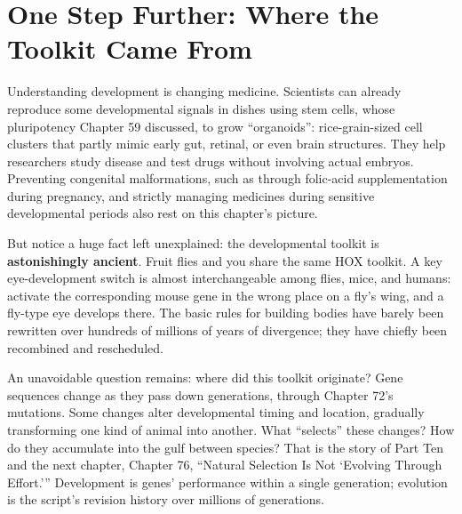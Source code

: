 \section{One Step Further: Where the Toolkit Came From}

Understanding development is changing medicine. Scientists can already reproduce some developmental signals in dishes using stem cells, whose pluripotency Chapter 59 discussed, to grow ``organoids'': rice-grain-sized cell clusters that partly mimic early gut, retinal, or even brain structures. They help researchers study disease and test drugs without involving actual embryos. Preventing congenital malformations, such as through folic-acid supplementation during pregnancy, and strictly managing medicines during sensitive developmental periods also rest on this chapter's picture.

But notice a huge fact left unexplained: the developmental toolkit is \textbf{astonishingly ancient}. Fruit flies and you share the same HOX toolkit. A key eye-development switch is almost interchangeable among flies, mice, and humans: activate the corresponding mouse gene in the wrong place on a fly's wing, and a fly-type eye develops there. The basic rules for building bodies have barely been rewritten over hundreds of millions of years of divergence; they have chiefly been recombined and rescheduled.

An unavoidable question remains: where did this toolkit originate? Gene sequences change as they pass down generations, through Chapter 72's mutations. Some changes alter developmental timing and location, gradually transforming one kind of animal into another. What ``selects'' these changes? How do they accumulate into the gulf between species? That is the story of Part Ten and the next chapter, Chapter 76, ``Natural Selection Is Not `Evolving Through Effort.''' Development is genes' performance within a single generation; evolution is the script's revision history over millions of generations.


